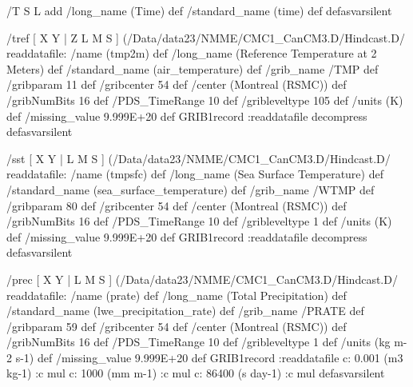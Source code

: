 \begin{ingrid}
%

/T { S L add
/long_name (Time) def
/standard_name (time) def } defasvarsilent

/tref {
[ X Y | Z L M S ] (/Data/data23/NMME/CMC1_CanCM3.D/Hindcast.D/%
readdatafile: 
/name (tmp2m) def
/long_name (Reference Temperature at 2 Meters) def
/standard_name (air_temperature) def
/grib_name /TMP def
/gribparam 11 def
/gribcenter 54 def
/center (Montreal (RSMC)) def
/gribNumBits 16 def
/PDS_TimeRange 10 def
/gribleveltype 105 def
/units (K) def
/missing_value 9.999E+20 def
GRIB1record
:readdatafile decompress
} defasvarsilent

/sst {
[ X Y | L M S ] (/Data/data23/NMME/CMC1_CanCM3.D/Hindcast.D/%
readdatafile: 
/name (tmpsfc) def
/long_name (Sea Surface Temperature) def
/standard_name (sea_surface_temperature) def
/grib_name /WTMP def
/gribparam 80 def
/gribcenter 54 def
/center (Montreal (RSMC)) def
/gribNumBits 16 def
/PDS_TimeRange 10 def
/gribleveltype 1 def
/units (K) def
/missing_value 9.999E+20 def
GRIB1record
:readdatafile decompress
} defasvarsilent

/prec {
[ X Y | L M S ] (/Data/data23/NMME/CMC1_CanCM3.D/Hindcast.D/%
readdatafile: 
/name (prate) def
/long_name (Total Precipitation) def
/standard_name (lwe_precipitation_rate) def
/grib_name /PRATE def
/gribparam 59 def
/gribcenter 54 def
/center (Montreal (RSMC)) def
/gribNumBits 16 def
/PDS_TimeRange 10 def
/gribleveltype 1 def
/units (kg m-2 s-1) def
/missing_value 9.999E+20 def
GRIB1record
:readdatafile
  c:
   0.001 (m3 kg-1) :c
   mul
  c:
   1000 (mm m-1) :c
   mul
  c:
   86400 (s day-1) :c
   mul
} defasvarsilent


\end{ingrid}
